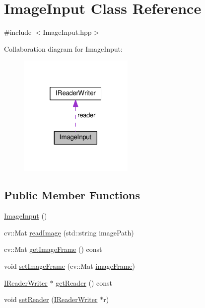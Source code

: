 \hypertarget{classImageInput}{}\section{Image\+Input Class Reference}
\label{classImageInput}


{\ttfamily \#include $<$Image\+Input.\+hpp$>$}



Collaboration diagram for Image\+Input\+:
\nopagebreak
\begin{figure}[H]
\begin{center}
\leavevmode
\includegraphics[width=157pt]{classImageInput__coll__graph}
\end{center}
\end{figure}
\subsection*{Public Member Functions}
\begin{DoxyCompactItemize}
\item 
\hyperlink{classImageInput_aca508a0b68659c71ad378cc0f2250298}{Image\+Input} ()
\item 
cv\+::\+Mat \hyperlink{classImageInput_a900eac6479654160858d9fe344bbf6d6}{read\+Image} (std\+::string image\+Path)
\item 
cv\+::\+Mat \hyperlink{classImageInput_a084f7e45ebe22d2ebbb507e7e1886988}{get\+Image\+Frame} () const 
\item 
void \hyperlink{classImageInput_ab2b3f3771c15d7172c4cd10dcb0d573e}{set\+Image\+Frame} (cv\+::\+Mat \hyperlink{classImageInput_a94723568a2a817760fe4e38fc11efb25}{image\+Frame})
\item 
\hyperlink{classIReaderWriter}{I\+Reader\+Writer} $\ast$ \hyperlink{classImageInput_a4b49b8a4ec9713412416ebd6de3753de}{get\+Reader} () const 
\item 
void \hyperlink{classImageInput_af61cc921f9911bef3d749fbc87ddf811}{set\+Reader} (\hyperlink{classIReaderWriter}{I\+Reader\+Writer} $\ast$r)
\end{DoxyCompactItemize}
